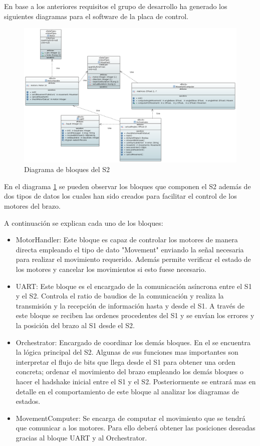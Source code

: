 En base a los anteriores requisitos el grupo de desarrollo ha generado los siguientes diagramas para el software de la placa de control.

\begin{figure}[H]
    \centering
    \includegraphics[width=1\linewidth]{pictures/S2BlockDiagram.PNG}
    \caption{Diagrama de bloques del S2}
    \label{fig:diagrama_bloques_s2}
\end{figure}

En el diagrama \ref{fig:diagrama_bloques_s2} se pueden observar los bloques que componen el S2 además de dos tipos de datos los cuales han sido creados para facilitar el control de los motores del brazo.

A continuación se explican cada uno de los bloques:

\begin{itemize}
    \item MotorHandler: Este bloque es capaz de controlar los motores de manera directa empleando el tipo de dato "Movement" enviando la señal necesaria para realizar el movimiento requerido. Además permite verificar el estado de los motores y cancelar los movimientos si esto fuese necesario.
    
    \item UART: Este bloque es el encargado de la comunicación asíncrona entre el S1 y el S2. Controla el ratio de baudios de la comunicación y realiza la transmisión y la recepción de información hasta y desde el S1. A través de este bloque se reciben las ordenes procedentes del S1 y se envían los errores y la posición del brazo al S1 desde el S2.
    
    \item Orchestrator: Encargado de coordinar los demás bloques. En el se encuentra la lógica principal del S2. Algunas de sus funciones mas importantes son interpretar el flujo de bits que llega desde el S1 para obtener una orden concreta; ordenar el movimiento del brazo empleando los demás bloques o hacer el hadshake inicial entre el S1 y el S2. Posteriormente se entrará mas en detalle en el comportamiento de este bloque al analizar los diagramas de estados.
    
    \item MovementComputer: Se encarga de computar el movimiento que se tendrá que comunicar a los motores. Para ello deberá obtener las posiciones deseadas gracias al bloque UART y al Orchestrator.
\end{itemize}

